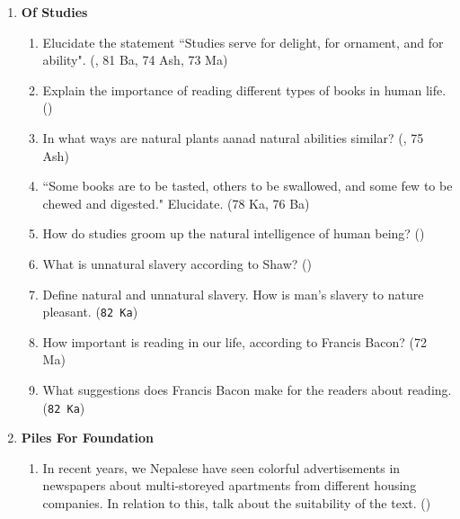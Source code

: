 \documentclass[12pt]{article}
\begin{document}
\begin{enumerate}
\begin{enumerate}
        \item `Knowledge and Wisdom are the two aaspects of the same coin'. Do you agree? If yes, why? \hfill ()
      \end{enumerate}

    \item \textbf{Of Studies}
      \begin{enumerate}
        \item Elucidate the statement ``Studies serve for delight, for ornament, and for ability". \hfill (, 81 Ba, 74 Ash, 73 Ma)

        \item Explain the importance of reading different types of books in human life. \hfill ()

        \item In what ways are natural plants aanad natural abilities similar? (, 75 Ash)

        \item ``Some books are to be tasted, others to be swallowed, and some few to be chewed and digested." Elucidate. \hfill (78 Ka, 76 Ba)

        \item How do studies groom up the natural intelligence of human being? \hfill ()

        \item What is unnatural slavery according to Shaw? \hfill ()

        \item Define natural and unnatural slavery. How is man's slavery to nature pleasant. \hfill (\texttt{82 Ka})

        \item How important is reading in our life, according to Francis Bacon? \hfill (72 Ma)

        \item What suggestions does Francis Bacon make for the readers about reading. \hfill (\texttt{82 Ka})
      \end{enumerate}

    \item \textbf{Piles For Foundation}
      \begin{enumerate}[noitemsep, topsep=0pt]
        \item In recent years, we Nepalese have seen colorful advertisements in newspapers about multi-storeyed apartments from different housing companies. In relation to this, talk about the suitability of the text. \hfill ()
      \end{enumerate}


\end{enumerate}
\end{document}
